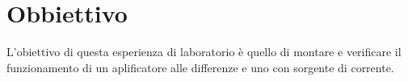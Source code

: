 \section*{Obbiettivo}

L'obiettivo di questa esperienza di laboratorio è quello di montare e verificare il funzionamento di un aplificatore alle differenze e uno con sorgente di corrente.